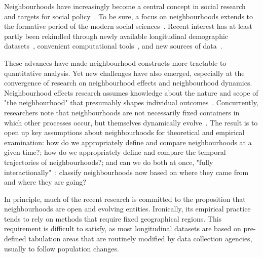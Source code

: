 
Neighbourhoods have increasingly become a central concept in social research and
targets for social
policy~\citep{sampson2012great,galster2019making,stone2015urban,looker2015nation}.
To be sure, a focus on neighbourhoods extends to the formative period of the
modern social sciences~\citep{Abbott1997}. Recent interest has at least partly
been rekindled through newly available longitudinal demographic
datasets~\citep{Logan2014,nhgis}, convenient computational
tools~\citep{rey2018spatio}, and new sources of data~\citep{Poorthuis2018}.


These advances have made neighbourhood constructs more tractable to quantitative
analysis. Yet new challenges have also emerged, especially at the convergence of
research on neighbourhood effects and neighbourhood dynamics. Neighbourhood
effects research assumes knowledge about the nature and scope of "the
neighbourhood" that presumably shapes individual
outcomes~\citep{Kwan2018,Shelton2019}. Concurrently, researchers note that
neighbourhoods are not necessarily fixed containers in which other processes
occur, but themselves dynamically
evolve~\citep{Delmelle2017,Reades2019,li2018new}. The result is to open up key
assumptions about neighbourhoods for theoretical and empirical examination: how
do we appropriately define and compare neighbourhoods at a given time?; how do
we appropriately define and compare the temporal trajectories of
neighbourhoods?; and can we do both at once, "fully
interactionally"~\citep{Abbott1997}: classify neighbourhoods now based on where
they came from and where they are going?


In principle, much of the recent research is committed to the proposition that
neighbourhoods are open and evolving entities. Ironically, its empirical
practice tends to rely on methods that require fixed geographical regions. This
requirement is difficult to satisfy, as most longitudinal datasets are based on
pre-defined tabulation areas that are routinely modified by data collection
agencies, usually to follow population changes. 

